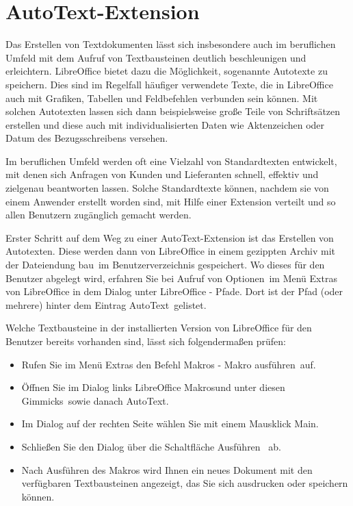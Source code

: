 \documentclass[a4paper,10pt,pagesize,titlepage]{scrbook}
\begin{document}
\section{AutoText-Extension}

Das Erstellen von Textdokumenten lässt sich insbesondere auch im beruflichen Umfeld mit dem Aufruf von Textbausteinen deutlich beschleunigen und erleichtern. LibreOffice bietet dazu die Möglichkeit, sogenannte Autotexte zu speichern. Dies sind im Regelfall häufiger verwendete Texte, die in LibreOffice auch mit Grafiken, Tabellen und Feldbefehlen verbunden sein können. Mit solchen Autotexten lassen sich dann beispielsweise große Teile von Schriftsätzen erstellen und diese auch mit individualisierten Daten wie Aktenzeichen oder Datum des Bezugsschreibens versehen.

Im beruflichen Umfeld werden oft eine Vielzahl von Standardtexten entwickelt, mit denen sich Anfragen von Kunden und Lieferanten schnell, effektiv und zielgenau beantworten lassen. Solche Standardtexte können, nachdem sie von einem Anwender erstellt worden sind, mit Hilfe einer Extension verteilt und so allen Benutzern zugänglich gemacht werden.

Erster Schritt auf dem Weg zu einer AutoText-Extension ist das Erstellen von Autotexten. Diese werden dann von LibreOffice in einem gezippten Archiv mit der Dateiendung \glqq bau\grqq~im Benutzerverzeichnis gespeichert. Wo dieses für den Benutzer abgelegt wird, erfahren Sie bei Aufruf von \glqq Optionen\grqq~im Menü Extras von LibreOffice in dem Dialog unter \glqq LibreOffice - Pfade\grqq. Dort ist der Pfad (oder mehrere) hinter dem Eintrag \glqq AutoText\grqq~gelistet.

Welche Textbausteine in der installierten Version von LibreOffice für den Benutzer bereits vorhanden sind, lässt sich folgendermaßen prüfen:
\begin{itemize}
	\item Rufen Sie im Menü Extras den Befehl \glqq Makros - Makro ausführen\grqq~auf.
	\item Öffnen Sie im Dialog links \glqq LibreOffice Makros\grqq und unter diesen \glqq Gimmicks\grqq~sowie danach \glqq AutoText\grqq.
	\item Im Dialog auf der rechten Seite wählen Sie mit einem Mausklick \glqq Main\grqq.
	\item Schließen Sie den Dialog über die Schaltfläche \glqq Ausführen\grqq~ ab.
	\item Nach Ausführen des Makros wird Ihnen ein neues Dokument mit den verfügbaren Textbausteinen angezeigt, das Sie sich ausdrucken oder speichern können.
\end{itemize}
\end{document}
